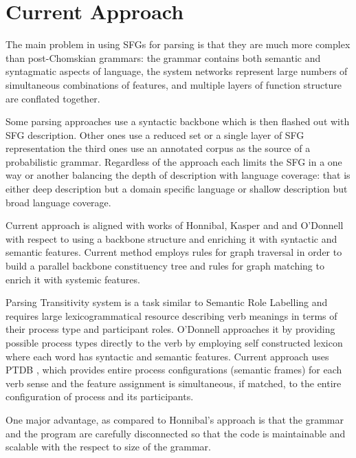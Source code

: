\section{Current Approach}
The main problem in using SFGs for parsing is that they are much more complex than post-Chomskian grammars: the grammar contains both semantic and syntagmatic aspects of language, the system networks represent large numbers of simultaneous combinations of features, and multiple layers of function structure are conflated together. 

Some parsing approaches use a syntactic backbone which is then flashed out with SFG description. Other ones use a reduced set or a single layer of SFG representation the third ones use an annotated corpus as the source of a probabilistic grammar. Regardless of the approach each limits the SFG in a one way or another balancing the depth of description with language coverage: that is either deep description but a domain specific language or shallow description but broad language coverage. 

Current approach is aligned with works of Honnibal, Kasper and and O'Donnell with respect to using a backbone structure and enriching it with syntactic and semantic features. Current method employs rules for graph traversal in order to build a parallel backbone constituency tree and rules for graph matching to enrich it with systemic features. 

Parsing Transitivity system is a task similar to Semantic Role Labelling and requires large lexicogrammatical resource describing verb meanings in terms of their process type and participant roles. O'Donnell approaches it by providing possible process types directly to the verb by employing self constructed lexicon where each word has syntactic and semantic features. Current approach uses PTDB \citep{Neale2002}, which provides entire process configurations (semantic frames) for each verb sense and the feature assignment is simultaneous, if matched, to the entire configuration of process and its participants.

One major advantage, as compared to Honnibal's approach is that the grammar and the program are carefully disconnected so that the code is maintainable and scalable with the respect to size of the grammar. 